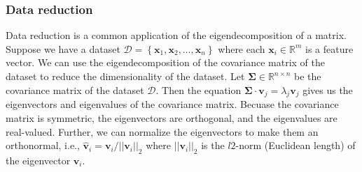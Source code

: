 \documentclass{article}[11pt]
\def\D{\mathcal{D}}
\newcommand{\norm}[1]{\left|\left|#1\right|\right|}
\begin{document}
\subsubsection*{Data reduction}
Data reduction is a common application of the eigendecomposition of a matrix. Suppose we have a dataset $\D = \left\{\mathbf{x}_{1},\mathbf{x}_{2},\dots,\mathbf{x}_{n}\right\}$ where each $\mathbf{x}_{i}\in\mathbb{R}^{m}$ is a feature vector.
We can use the eigendecomposition of the covariance matrix of the dataset to reduce the dimensionality of the dataset.
Let $\mathbf{\Sigma}\in\mathbb{R}^{n\times{n}}$ be the covariance matrix of the dataset $\D$. 
Then the equation $\mathbf{\Sigma}\cdot\mathbf{v}_{j} = \lambda_{j}\mathbf{v}_{j}$ gives us the eigenvectors and eigenvalues of the covariance matrix.
Becuase the covariance matrix is symmetric, the eigenvectors are orthogonal, and the eigenvalues are real-valued.
Further, we can normalize the eigenvectors to make them an orthonormal, 
i.e., $\hat{\mathbf{v}}_{i} = \mathbf{v}_{i}/\norm{\mathbf{v}_{i}}_{2}$ where $\norm{\mathbf{v}_{i}}_{2}$ is the $l2$-norm (Euclidean length) of the eigenvector $\mathbf{v}_{i}$.
\end{document}
